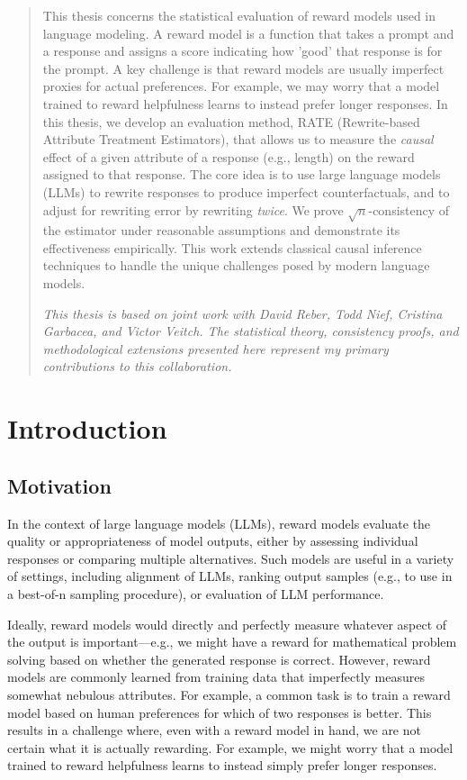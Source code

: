 \documentclass{article}
\theoremstyle{definition}
\begin{document}
\begin{abstract}
This thesis concerns the statistical evaluation of reward models used in language modeling. A reward model is a function that takes a prompt and a response and assigns a score indicating how 'good' that response is for the prompt. A key challenge is that reward models are usually imperfect proxies for actual preferences. For example, we may worry that a model trained to reward helpfulness learns to instead prefer longer responses. In this thesis, we develop an evaluation method, RATE (Rewrite-based Attribute Treatment Estimators), that allows us to measure the \emph{causal} effect of a given attribute of a response (e.g., length) on the reward assigned to that response. The core idea is to use large language models (LLMs) to rewrite responses to produce imperfect counterfactuals, and to adjust for rewriting error by rewriting \emph{twice}. We prove $\sqrt{n}$-consistency of the estimator under reasonable assumptions and demonstrate its effectiveness empirically. This work extends classical causal inference techniques to handle the unique challenges posed by modern language models.

\textit{This thesis is based on joint work with David Reber, Todd Nief, Cristina Garbacea, and Victor Veitch. The statistical theory, consistency proofs, and methodological extensions presented here represent my primary contributions to this collaboration.}
\end{abstract}

\section{Introduction}
\subsection{Motivation}
In the context of large language models (LLMs), reward models evaluate the quality or appropriateness of model outputs, either by assessing individual responses or comparing multiple alternatives. Such models are useful in a variety of settings, including alignment of LLMs, ranking output samples (e.g., to use in a best-of-n sampling procedure), or evaluation of LLM performance.

Ideally, reward models would directly and perfectly measure whatever aspect of the output is important—e.g., we might have a reward for mathematical problem solving based on whether the generated response is correct. However, reward models are commonly learned from training data that imperfectly measures somewhat nebulous attributes. For example, a common task is to train a reward model based on human preferences for which of two responses is better. This results in a challenge where, even with a reward model in hand, we are not certain what it is actually rewarding. For example, we might worry that a model trained to reward helpfulness learns to instead simply prefer longer responses.
\end{document}
